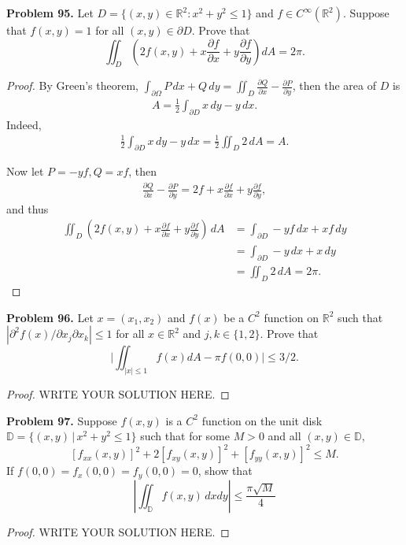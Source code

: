 \documentclass[11pt]{article}
\theoremstyle{definition}
\theoremstyle{definition}
\begin{document}
\medskip

\noindent
{\bf Problem 95.}
Let $D =\{(x, y)\in\mathbb{R}^2 : x^2 + y^2\leq 1\}$ and $f\in C^\infty(\mathbb{R}^2)$. Suppose that $f(x, y) = 1$ for all
$(x, y)\in\partial D$. Prove that
$$
\iint_D \left(2f(x,y)+x\frac{\partial f}{\partial x}+y\frac{\partial f}{\partial y}\right)dA=2\pi.
$$
\begin{proof}
By Green's theorem, $\int_{\partial \Omega} P\, dx + Q\, dy = \iint_D \frac{\partial Q}{\partial x} - \frac{\partial P}{\partial y}$, then the area of $D$ is 
\begin{align*}
    A = \frac{1}{2} \int_{\partial D} x\, dy - y\, dx.
\end{align*}
Indeed, 
\begin{align*}
    \frac{1}{2} \int_{\partial D} x\, dy - y\, dx = \frac{1}{2} \iint_D 2\, dA = A.
\end{align*}

Now let $P = -yf, Q = xf$, then 
\begin{align*}
    \frac{\partial Q}{\partial x} - \frac{\partial P}{\partial y} = 2f + x \frac{\partial f}{\partial x} + y \frac{\partial f}{\partial y},
\end{align*}
and thus
\begin{align*}
    \iint_D \left(2f(x,y)+x\frac{\partial f}{\partial x}+y\frac{\partial f}{\partial y}\right)\, dA & = \int_{\partial D} -yf\, dx + x f\, dy \\
    & = \int_{\partial D} -y \, dx + x \, dy \\
    & = \iint_D 2\, dA = 2\pi.
\end{align*}
\end{proof}


\medskip


\noindent
{\bf Problem 96.}
Let $x = (x_1, x_2)$  and $f(x) $ be a $C^2$ function on $\mathbb{R}^2$ such that
$ |\partial^2 f (x)/\partial x_j \partial x_k| \le 1$ for all $x \in \mathbb{R}^2$ and $ j, k \in \{1,2\}$.
Prove that
$$
\bigg|\iint_{|x| \le 1} f(x) dA - \pi f(0,0)\bigg| \le 3/2.
$$
\begin{proof}
	WRITE YOUR SOLUTION HERE.
\end{proof}


\medskip



\noindent
{\bf Problem 97.}
Suppose $f(x,y)$ is a $C^2$ function on the unit disk $\mathbb{D} = \{(x,y)\,|\,x^2+y^2\leq 1\}$ such that for some $M>0$ and all $(x,y)\in\mathbb{D}$,
$$ \left[f_{xx}(x,y)\right]^2 + 2\left[f_{xy}(x,y)\right]^2 + \left[f_{yy}(x,y)\right]^2 \leq M. $$
If $f(0,0) = f_x(0,0) = f_y(0,0) = 0$, show that
$$ \left\lvert \iint_{\mathbb{D}} f(x,y)\,\mathit{dx}\mathit{dy} \right\rvert \leq \frac{\pi\sqrt{M}}{4} $$
\begin{proof}
	WRITE YOUR SOLUTION HERE.
\end{proof}
\end{document}
